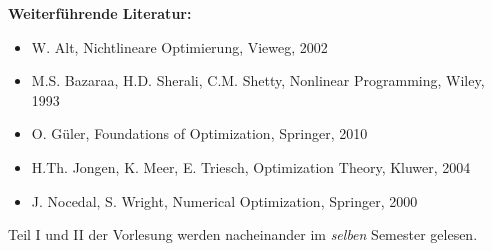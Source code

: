 \begin{course}
\begin{literature}\textbf{Weiterführende Literatur:}

 \begin{itemize}\item W. Alt, Nichtlineare Optimierung, Vieweg, 2002  \item M.S. Bazaraa, H.D. Sherali, C.M. Shetty, Nonlinear Programming, Wiley, 1993  \item O. Güler, Foundations of Optimization, Springer, 2010  \item H.Th. Jongen, K. Meer, E. Triesch, Optimization Theory, Kluwer, 2004  \item J. Nocedal, S. Wright, Numerical Optimization, Springer, 2000  \end{itemize}\end{literature}

\begin{remarks}Teil I und II der Vorlesung werden nacheinander im \emph{selben }Semester gelesen.

\end{remarks}

\end{course}